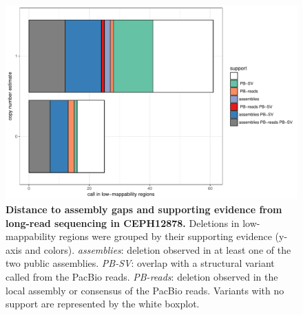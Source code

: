 \begin{figure}[htp]
  \includegraphics[width=\linewidth,page=2]{figures/PopSV-NA12878-assembly-lowMap.pdf}
  \caption[Distance to assembly gaps and supporting evidence from long-read sequencing in CEPH12878.]{{\bf Distance to assembly gaps and supporting evidence from long-read sequencing in CEPH12878.} {\small Deletions in low-mappability regions were grouped by their supporting evidence (y-axis and colors). {\it assemblies}: deletion observed in at least one of the two public assemblies. {\it PB-SV}: overlap with a structural variant called from the PacBio reads\cite{Pendleton2015}. {\it PB-reads}: deletion observed in the local assembly or consensus of the PacBio reads. Variants with no support are represented by the white boxplot.}}
  \label{fig:cephGap}
\end{figure}

